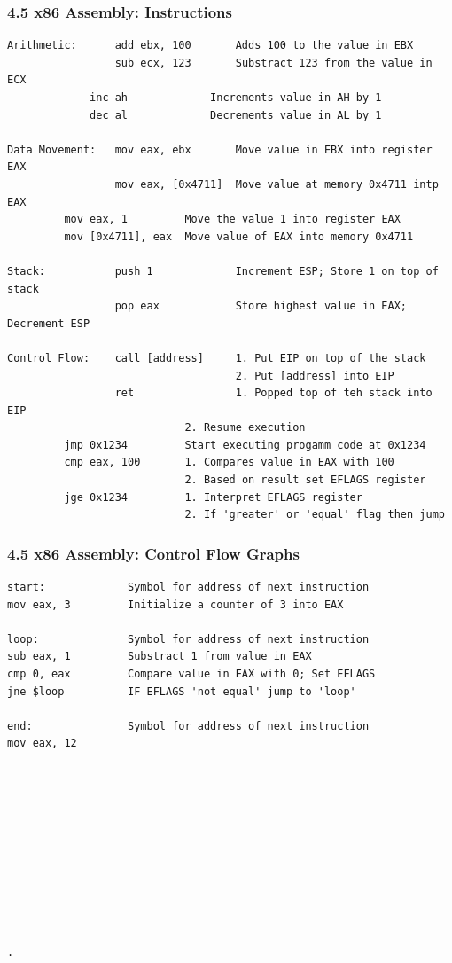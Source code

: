 \begin{frame}[fragile]
  \frametitle{4.5 x86 Assembly: Instructions}
  \begin{lstlisting}[basicstyle=\tiny]
Arithmetic:      add ebx, 100       Adds 100 to the value in EBX
                 sub ecx, 123       Substract 123 from the value in ECX
	         inc ah             Increments value in AH by 1
	         dec al             Decrements value in AL by 1

Data Movement:   mov eax, ebx       Move value in EBX into register EAX
                 mov eax, [0x4711]  Move value at memory 0x4711 intp EAX
		 mov eax, 1         Move the value 1 into register EAX
		 mov [0x4711], eax  Move value of EAX into memory 0x4711

Stack:           push 1             Increment ESP; Store 1 on top of stack
                 pop eax            Store highest value in EAX; Decrement ESP

Control Flow:    call [address]     1. Put EIP on top of the stack
                                    2. Put [address] into EIP
                 ret                1. Popped top of teh stack into EIP
		                    2. Resume execution
		 jmp 0x1234         Start executing progamm code at 0x1234
		 cmp eax, 100       1. Compares value in EAX with 100
		                    2. Based on result set EFLAGS register
		 jge 0x1234         1. Interpret EFLAGS register
		                    2. If 'greater' or 'equal' flag then jump
  \end{lstlisting}
\end{frame}


\begin{frame}[fragile]
  \frametitle{4.5 x86 Assembly: Control Flow Graphs}
  \begin{lstlisting}[basicstyle=\tiny]
start:             Symbol for address of next instruction
mov eax, 3         Initialize a counter of 3 into EAX

loop:              Symbol for address of next instruction
sub eax, 1         Substract 1 from value in EAX
cmp 0, eax         Compare value in EAX with 0; Set EFLAGS
jne $loop          IF EFLAGS 'not equal' jump to 'loop'

end:               Symbol for address of next instruction
mov eax, 12











.
  \end{lstlisting}
\end{frame}


